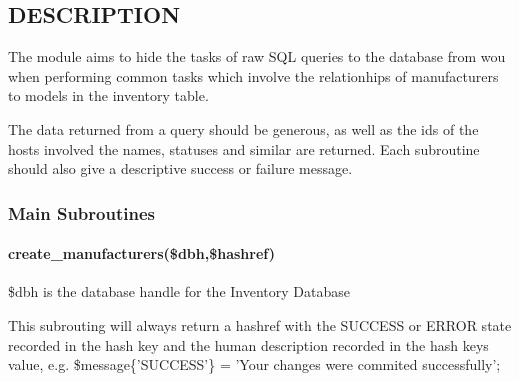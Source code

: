 \documentclass{book}
\begin{document}
\subsection{DESCRIPTION}
\label{Inventory::Manufacturers_DESCRIPTION}
\hypertarget{Inventory::Manufacturers_DESCRIPTION}{}



The module aims to hide the tasks of raw SQL queries to the database from wou when performing common tasks which involve the relationhips of manufacturers to models in the inventory table.



The data returned from a query should be generous, as well as the ids of the hosts involved the names, statuses and similar are returned. Each subroutine should also give a descriptive success or failure message.


\subsubsection{Main Subroutines}
\label{Inventory::Manufacturers_Main_Subroutines}
\hypertarget{Inventory::Manufacturers_Main_Subroutines}{}


\paragraph*{create\protect\_manufacturers(\$dbh,\$hashref)}
\label{Inventory::Manufacturers_create_manufacturers_dbh_hashref_}
\hypertarget{Inventory::Manufacturers_create_manufacturers_dbh_hashref_}{}



\$dbh is the database handle for the Inventory Database



This subrouting will always return a hashref with the SUCCESS or ERROR state recorded in the hash key and the human description recorded in the hash keys value, e.g. \$message\{'SUCCESS'\} = 'Your changes were commited successfully';
\end{document}
